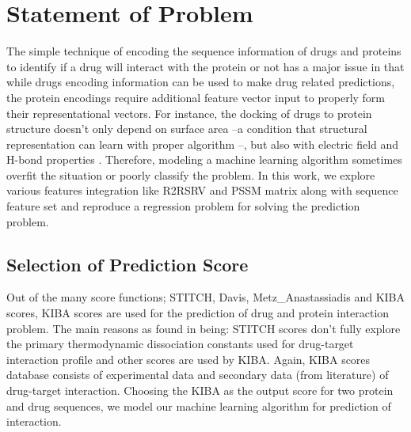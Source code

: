 \iffalse

For citations, use the function \textbackslash cite. \cite{gowar1989power} The references file is the sample.bib one. Google Scholar provides almost all the references in LaTeX form.

To insert a footnote, use the following command. \footnote{This is a footnote.} When necessary to use a nomenclature, define it on the same page for a better organization. Don't create NSN (Non-sense nomenclatures).

For figures, tables, equations and further information, open the file "tips.tex". If what you need is not found there, Google it.

\fi
 
\section{Statement of Problem}
The simple technique of encoding the sequence information of drugs and proteins to identify if a drug will interact with the protein or not has a major issue in that while drugs encoding information can be used to make drug related predictions, the protein encodings require additional feature vector input to properly form their representational vectors. For instance, the docking of drugs to protein structure doesn't only depend on surface area --a condition that structural representation can learn with proper algorithm --, but also with electric field and H-bond properties \cite{Wong2018}. Therefore, modeling a machine learning algorithm sometimes overfit the situation or poorly classify the problem. In this work, we explore various features integration like R2RSRV and PSSM matrix along with sequence feature set and reproduce a regression problem for solving the prediction problem.

\subsection{Selection of Prediction Score}

Out of the many score functions; STITCH, Davis, Metz\_Anastassiadis and KIBA scores, KIBA scores are used for the prediction of drug and protein interaction problem. The main reasons as found in \cite[Tang et al.]{Tang2013} being: STITCH scores don't fully explore the primary thermodynamic dissociation constants used for drug-target interaction profile and other scores are used by KIBA.  Again, KIBA scores database consists of experimental data and secondary data (from literature) of drug-target interaction. Choosing the KIBA as the output score for two protein and drug sequences, we model our machine learning algorithm for prediction of interaction.

